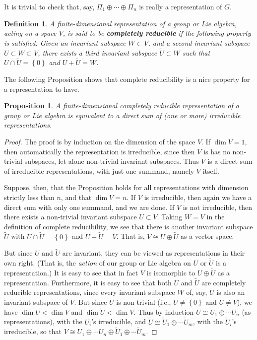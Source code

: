 \documentclass[12pt]{amsbook}
\theoremstyle{plain}
\newtheorem{definition}[theorem]{Definition}
\newtheorem{proposition}[theorem]{Proposition}
\numberwithin{equation}{chapter}
\numberwithin{theorem}{chapter}
\begin{document}
It is trivial to check that, say, $\Pi_{1}\oplus\cdots\oplus\Pi_{n}$ is really
a representation of $G$.

\begin{definition}
A finite-dimensional representation of a group or Lie algebra, acting on a
space $V$, is said to be \textbf{completely reducible} if the following
property is satisfied: Given an invariant subspace $W\subset V$, and a second
invariant subspace $U\subset W\subset V$, there exists a third invariant
subspace $\widetilde{U}\subset W$ such that $U\cap\widetilde{U}=\left\{
0\right\}  $ and $U+\widetilde{U}=W$.
\end{definition}

The following Proposition shows that complete reducibility is a nice property
for a representation to have.

\begin{proposition}
A finite-dimensional completely reducible representation of a group or Lie
algebra is equivalent to a direct sum of (one or more) irreducible representations.
\end{proposition}

\begin{proof}
The proof is by induction on the dimension of the space $V$. If $\dim V=1$,
then automatically the representation is irreducible, since then $V$ is has no
non-trivial subspaces, let alone non-trivial invariant subspaces. Thus $V$ is
a direct sum of irreducible representations, with just one summand, namely $V$ itself.

Suppose, then, that the Proposition holds for all representations with
dimension strictly less than $n$, and that $\dim V=n$. If $V$ is irreducible,
then again we have a direct sum with only one summand, and we are done. If $V$
is not irreducible, then there exists a non-trivial invariant subspace
$U\subset V$. Taking $W=V$ in the definition of complete reducibility, we see
that there is another invariant subspace $\widetilde{U}$ with $U\cap
\widetilde{U}=\left\{  0\right\}  $ and $U+\widetilde{U}=V$. That is, $V\cong
U\oplus\widetilde{U}$ as a vector space.

But since $U$ and $\widetilde{U}$ are invariant, they can be viewed as
representations in their own right. (That is, the \textit{action} of our group
or Lie algebra on $U$ or $\widetilde{U}$ is a representation.) It is easy to
see that in fact $V$ is isomorphic to $U\oplus\widetilde{U}$ as a
representation. Furthermore, it is easy to see that both $U$ and
$\widetilde{U}$ are completely reducible representations, since every
invariant subspace $W$ of, say, $U$ is also an invariant subspace of $V$. But
since $U$ is non-trivial (i.e., $U\neq\left\{  0\right\}  $ and $U\neq V$), we
have $\dim U<\dim V$ and $\dim\widetilde{U}<\dim V$. Thus by induction $U\cong
U_{1}\oplus\cdots U_{n}$ (as representations), with the $U_{i}$'s irreducible,
and $\widetilde{U}\cong\widetilde{U}_{1}\oplus\cdots\widetilde{U}_{m}$, with
the $\widetilde{U}_{i}$'s irreducible, so that $V\cong U_{1}\oplus\cdots
U_{n}\oplus\widetilde{U}_{1}\oplus\cdots\widetilde{U}_{m}$.
\end{proof}
\end{document}
